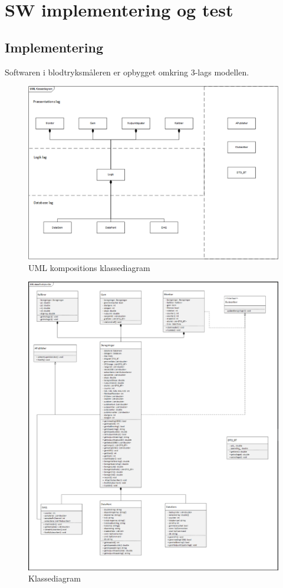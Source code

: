 \chapter{SW implementering og test }

\section{Implementering}
Softwaren i blodtryksmåleren er opbygget omkring 3-lags modellen. 

\begin{figure}[H]
	\centering
	\includegraphics[width=1\textwidth]{Figurer/3lagsmodel_software}
	\caption{UML kompositions klassediagram}
\end{figure}

\begin{figure}[H]
	\centering
	\includegraphics[width=1\textwidth]{Figurer/classdiagram}
	\caption{Klassediagram}
\end{figure}

